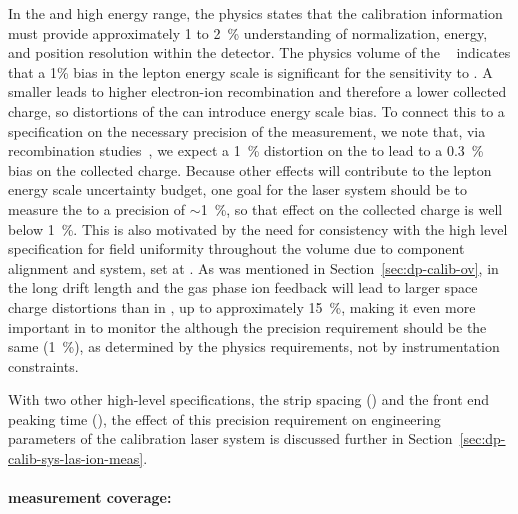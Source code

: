 In the  and high energy range, the  physics  states that the calibration information must provide approximately \num{1} to \SI{2}{\%} understanding of normalization, energy, and position resolution within the detector.
The physics volume of the  ~\cite{Acciarri:2015uup} indicates that a \num{1}\% bias in the lepton energy scale is significant for the  sensitivity to . 
A smaller \efield leads to higher electron-ion recombination and therefore a lower collected charge, so distortions of the \efield can introduce
energy scale bias. To connect this
to a specification on the necessary precision of the \efield measurement, we note that, via recombination studies~\cite{bib:mooney2018}, we expect a \SI{1}{\%} distortion on the \efield to lead to a \SI{0.3}{\%} bias on the collected charge.
Because other effects will contribute to the lepton energy scale uncertainty budget, one goal for the 
laser system should be to measure the \efield to a precision of $\sim$\SI{1}{\%}, so that effect on the collected charge is well below \SI{1}{\%}.
This is also motivated by the need for consistency with the high level  specification for field uniformity throughout the volume due to component alignment and  system, set at \fielduniformity.
As was mentioned in Section~\ref{sec:dp-calib-ov}, in  the long drift length and the gas phase ion feedback will lead to larger space charge \efield distortions than in , up to approximately \SI{15}{\%}, making it even more important in  to monitor the \efield although the precision requirement should be the same (\SI{1}{\%}), as determined by the physics requirements, not by instrumentation constraints.

With two other high-level  specifications, the  strip spacing (\dpstrippitch) and the front end peaking time (\fepeaktime), the effect of this \efield precision requirement on engineering parameters of the calibration laser system is discussed further %
in Section~\ref{sec:dp-calib-sys-las-ion-meas}.

\paragraph{\efield measurement coverage:}

